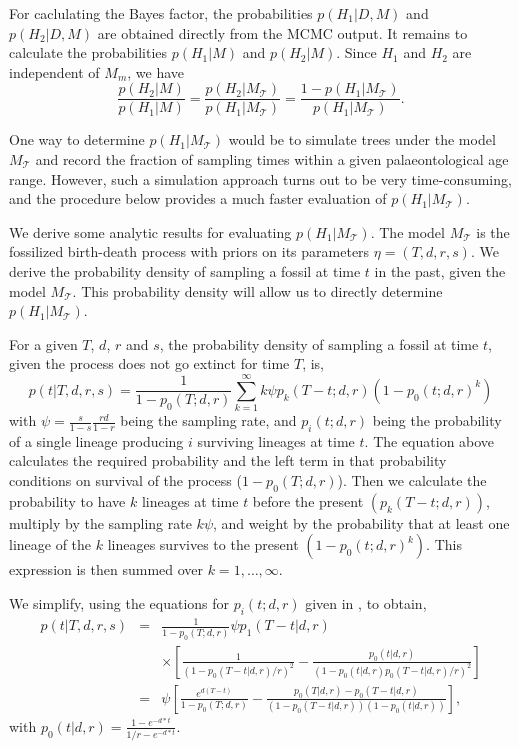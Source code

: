 \documentclass[11pt]{article}
\begin{document}
For caclulating the Bayes factor, the probabilities $p(H_1|D,M)$ and $p(H_2|D,M)$ are obtained directly from the MCMC output.
It remains to calculate the probabilities $p(H_1|M)$ and $p(H_2|M)$.
Since $H_1$ and $H_2$ are independent of $M_m$, we have $$\frac{p(H_2|M)}{p(H_1|M)}=\frac{p(H_2|M_\mathcal{T})}{p(H_1|M_\mathcal{T})}=\frac{1-p(H_1|M_\mathcal{T})}{p(H_1|M_\mathcal{T})}.$$

One way to determine $p(H_1|M_\mathcal{T})$ would be to simulate trees under the model $M_\mathcal{T}$ and record the fraction of sampling times  within a given palaeontological age range. However, such a simulation approach turns out to be very time-consuming, and the procedure below provides a much faster evaluation of $p(H_1|M_\mathcal{T})$.

We   derive some analytic results for evaluating $p(H_1|M_\mathcal{T})$. 
The model $M_\mathcal{T}$ is the fossilized birth-death process with priors on its parameters $\eta=(T,d,r,s)$. 
We derive the probability density of sampling a fossil at time $t$ in the past, given the model $M_\mathcal{T}$. This probability density will allow us to directly determine $p(H_1|M_\mathcal{T})$.

For a given $T$, $d$, $r$ and $s$, the probability density of sampling a fossil at time $t$, given the process does not go extinct for time $T$, is,
$$p(t|T,d,r,s) = \frac{1}{1-p_0(T;d,r)} \sum_{k=1}^\infty k \psi p_k(T-t;d,r) (1-p_0(t;d,r)^k)$$
with $\psi=\frac{s}{1-s} \frac{rd}{1-r}$ being the sampling rate, and $p_i(t;d,r)$ being the probability of a single lineage producing $i$ surviving lineages at time $t$.
The equation above calculates the required probability and the left term in that probability conditions on survival of the process ($1-p_0(T;d,r)$). Then we calculate the probability to have $k$ lineages at time $t$ before the present $( p_k(T-t;d,r))$, multiply by the sampling rate $k \psi$, and weight by the probability that at least one lineage of the $k$ lineages survives to the present $ (1-p_0(t;d,r)^k)$. This expression is then summed over $k=1,\ldots, \infty$.

We simplify, using the equations for $p_i(t;d,r)$ given in \cite{kendall1948}, to obtain,
\begin{eqnarray*}
p(t|T,d,r,s) &=& \frac{1}{1-p_0(T;d,r)}  \psi p_1(T-t|d,r) \\ & & \times \left[  \frac{1}{(1-p_0(T-t|d,r)/r)^2} - \frac{p_0(t|d,r)}{(1-p_0(t|d,r) p_0(T-t|d,r)/r)^2}  \right]\\
&=&  \psi  \left[ \frac{e^{d(T-t)}}{1-p_0(T;d,r)} - \frac{p_0(T|d,r)-p_0(T-t|d,r)}{(1-p_0(T-t|d,r))(1-p_0(t|d,r))} \right],
\end{eqnarray*}
with $p_0(t|d,r) = \frac{1-e^{-d*t}}{1/r - e^{-d*t}}$.
\end{document}
